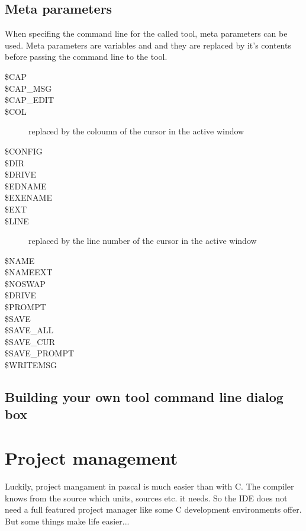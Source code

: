 \subsection{Meta parameters}
When specifing the command line for the called tool, meta parameters can
be used. Meta parameters are variables and and they are replaced
by it's contents before passing the command line to the tool.

\begin{description}
\item[\$CAP]
\item[\$CAP\_MSG]
\item[\$CAP\_EDIT]
\item[\$COL] replaced by the coloumn of the cursor in the active window
\item[\$CONFIG]
\item[\$DIR]
\item[\$DRIVE]
\item[\$EDNAME]
\item[\$EXENAME]
\item[\$EXT]
\item[\$LINE] replaced by the line number of the cursor in the active window
\item[\$NAME]
\item[\$NAMEEXT]
\item[\$NOSWAP]
\item[\$DRIVE]
\item[\$PROMPT]
\item[\$SAVE]
\item[\$SAVE\_ALL]
\item[\$SAVE\_CUR]
\item[\$SAVE\_PROMPT]
\item[\$WRITEMSG]
\end{description}

\subsection{Building your own tool command line dialog box}

\section{Project management}
\label{se:projectmanagement}
Luckily, project mangament in pascal is much easier than with C. The
compiler knows from the source which units, sources etc. it needs.
So the \fpc IDE does not need a full featured project manager like
some C development environments offer. But some things make life easier...


